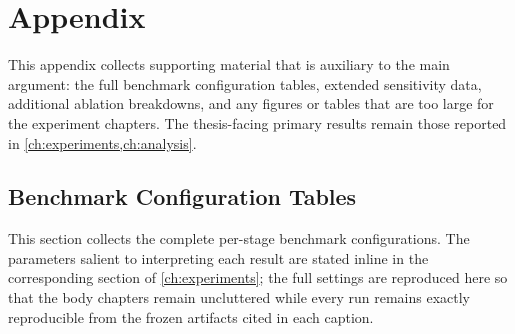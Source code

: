 \chapter{Appendix}%
\label{ch:appendix}

This appendix collects supporting material that is auxiliary to the main
argument: the full benchmark configuration tables, extended sensitivity data,
additional ablation breakdowns, and any figures or tables that are too large for
the experiment chapters. The thesis-facing primary results remain those reported
in \cref{ch:experiments,ch:analysis}.

\section{Benchmark Configuration Tables}
\label{sec:appendix-benchmark-configs}

This section collects the complete per-stage benchmark configurations. The
parameters salient to interpreting each result are stated inline in the
corresponding section of \cref{ch:experiments}; the full settings are reproduced
here so that the body chapters remain uncluttered while every run remains exactly
reproducible from the frozen artifacts cited in each caption.

\begin{table}[htbp]
\centering
\caption[Stage~L1 benchmark configuration]{Stage~L1 benchmark configuration. Source: \texttt{config.yaml} in \texttt{rq1\_1\_20260515\_111428}.}
\label{tab:rq11-config}
\end{table}


